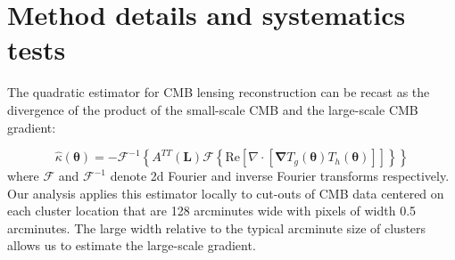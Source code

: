 \documentclass[preprint2]{aastex63}
\newcommand{\bL}{{\boldsymbol{L}}}
\newcommand{\rmn}{\mathrm}
\begin{document}




\appendix

\section{Method details and systematics tests}
\label{app:details}

The quadratic estimator for CMB lensing reconstruction can be recast as the divergence of the product of the small-scale CMB and the large-scale CMB gradient:

\begin{equation}
\label{Eq:kappaEst}
\hat{\kappa}(\boldsymbol{\theta}) =-\mathcal{F}^{-1}\left\{A^{TT}(\bL) \mathcal{F}\left\{ \rmn{Re}\left[\nabla \cdot \left[\boldsymbol{\nabla}T_g(\boldsymbol{\theta}) T_h(\boldsymbol{\theta}) \right]\right]\right\}\right\}
\end{equation}
%
where $\mathcal{F}$ and $\mathcal{F}^{-1}$ denote 2d Fourier and inverse Fourier transforms respectively. Our analysis applies this estimator locally to cut-outs of CMB data centered on each cluster location that are 128 arcminutes wide  with pixels of width 0.5 arcminutes. The large width relative to the typical arcminute size of clusters allows us to estimate the large-scale gradient.
\end{document}
